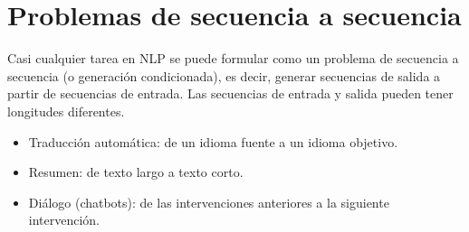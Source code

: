 




\section{Problemas de secuencia a secuencia}
Casi cualquier tarea en NLP se puede formular como un problema de secuencia a secuencia (o generación condicionada), es decir, generar secuencias de salida a partir de secuencias de entrada. Las secuencias de entrada y salida pueden tener longitudes diferentes.
\begin{itemize}
\item Traducción automática: de un idioma fuente a un idioma objetivo.
\item Resumen: de texto largo a texto corto.
\item Diálogo (chatbots): de las intervenciones anteriores a la siguiente intervención.
\end{itemize}

